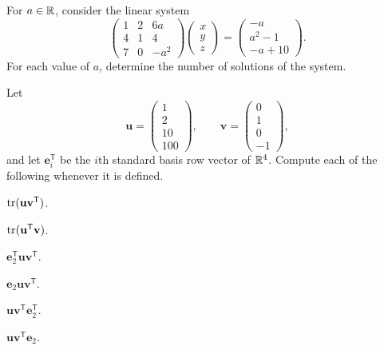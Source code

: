 \begin{problem}
For $a\in\mathbb{R}$, consider the linear system
\[
\begin{pmatrix}
1&2&6a\\
4&1&4\\
7&0&-a^2
\end{pmatrix}
\begin{pmatrix}x\\y\\z\end{pmatrix}
=
\begin{pmatrix}-a\\a^2-1\\-a+10\end{pmatrix}.
\]
For each value of $a$, determine the number of solutions of the system.
\end{problem}

\begin{problem}
Let
\[
\mathbf u=
\begin{pmatrix}1\\2\\10\\100\end{pmatrix},
\qquad
\mathbf v=
\begin{pmatrix}0\\1\\0\\-1\end{pmatrix},
\]
and let $\mathbf e_i^{\mathsf T}$ be the $i$th standard basis row vector of $\mathbb{R}^4$. Compute each of the following whenever it is defined.
\begin{problemchoices}
\item $\operatorname{tr}(\mathbf u\mathbf v^{\mathsf T})$.
\item $\operatorname{tr}(\mathbf u^{\mathsf T}\mathbf v)$.
\item $\mathbf e_2^{\mathsf T}\mathbf u\mathbf v^{\mathsf T}$.
\item $\mathbf e_2\mathbf u\mathbf v^{\mathsf T}$.
\item $\mathbf u\mathbf v^{\mathsf T}\mathbf e_2^{\mathsf T}$.
\item $\mathbf u\mathbf v^{\mathsf T}\mathbf e_2$.
\end{problemchoices}
\end{problem}

